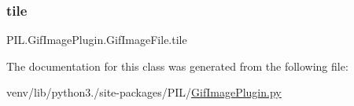 \subsubsection{\texorpdfstring{tile}{tile}}
{\footnotesize\ttfamily P\+I\+L.\+Gif\+Image\+Plugin.\+Gif\+Image\+File.\+tile}



The documentation for this class was generated from the following file\+:\begin{DoxyCompactItemize}
\item 
venv/lib/python3./site-\/packages/\+P\+I\+L/\hyperlink{GifImagePlugin_8py}{Gif\+Image\+Plugin.\+py}\end{DoxyCompactItemize}
